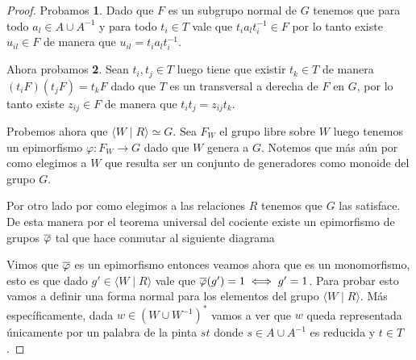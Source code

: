 \documentclass[tesis.tex]{subfiles}
\begin{document}
	
	\begin{proof}
		Probamos \textbf{1}.
		Dado que $F$ es un subgrupo normal de $G$ tenemos que para todo $a_{l} \in A \cup A^{-1}$ y para todo $t_{i} \in T$ vale que $t_{i}a_{l}t_{i}^{-1} \in F$ por lo tanto existe $u_{il} \in F$ de manera que $u_{il} = t_{i}a_{l}t_{i}^{-1}$.

		Ahora probamos \textbf{2}.
		Sean $t_{i},t_{j} \in T$ luego tiene que existir $t_{k} \in T$ de manera $(t_{i}F)(t_{j}F) = t_{k} F$ dado que $T$ es un transversal a derecha de $F$ en $G$, por lo tanto existe $z_{ij} \in F$ de manera que $t_{i}t_{j} = z_{ij}t_{k}$.

		Probemos ahora que $\langle W \mid R \rangle \simeq G$.
		Sea $F_{W}$ el grupo libre sobre $W$ luego tenemos un epimorfismo $\varphi:F_{W} \to G$ dado que $W$ genera a $G$.
		Notemos que más aún por como elegimos a $W$ que resulta ser un conjunto de generadores como monoide del grupo $G$. 

		Por otro lado por como elegimos a las relaciones $R$ tenemos que $G$ las satisface.
		De esta manera por el teorema universal del cociente existe un epimorfismo de grupos $\overline \varphi$ tal que hace conmutar al siguiente diagrama	
		\begin{center}
		\end{center}
		
		Vimos que $\overline \varphi$ es un epimorfismo entonces veamos ahora que es un monomorfismo, esto es que dado $g' \in \langle W \mid R \rangle$ vale que $\overline{\varphi}(g') = 1 \iff g' = 1$.
		Para probar esto vamos a definir una forma normal para los elementos del grupo $\langle W \mid R \rangle$.
		Más específicamente, dada $w \in (W \cup W^{-1})^{*}$ vamos a ver que $w$ queda representada únicamente por un palabra de la pinta $st$ donde $s \in A \cup A^{-1}$ es reducida y $t \in T$. 
		


\end{proof}
\end{document}

